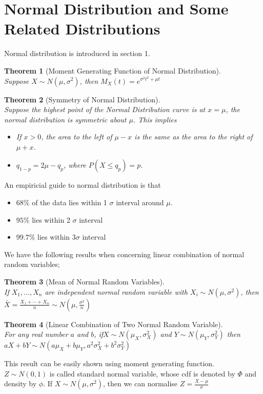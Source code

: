 \documentclass[12pt]{article}
\newtheorem{theorem}{Theorem}[section]
\theoremstyle{definition}
\begin{document}
\section{Normal Distribution and Some Related Distributions}
Normal distribution is introduced in section 1. 
\begin{theorem}[Moment Generating Function of Normal Distribution]
\hfill\\\normalfont Suppose $X\sim N(\mu, \sigma^2)$, then
$
M_X(t) = e^{\sigma^2t^2+\mu t}
$
\end{theorem}
\begin{theorem}[Symmetry of Normal Distribution]
\hfill\\\normalfont Suppose the highest point of the Normal Distribution curve is at $x=\mu$, the normal distribution is symmetric about $\mu$. This implies
\begin{itemize}
  \item If $x>0$, the area to the left of $\mu-x$ is the same as the area to the right of $\mu+x$.
  \item $q_{1-p} = 2\mu-q_p$, where $P(X\leq q_p) = p$.
\end{itemize}
\end{theorem}
An empiricial guide to normal distribution is that 
\begin{itemize}
  \item $68\%$ of the data lies within 1 $\sigma$ interval around $\mu$.
  \item $95\%$ lies within 2 $\sigma$ interval
  \item $99.7\%$ lies within 3$\sigma$ interval
\end{itemize}
We have the following results when concerning linear combination of normal random variables;
\begin{theorem}[Mean of Normal Random Variables]
\hfill\\\normalfont If $X_1,\ldots, X_n$ are independent normal random variable with $X_i\sim N(\mu, \sigma^2)$, then
$
\bar{X} = \frac{X_1+\cdots+X_n}{n} \sim N(\mu, \frac{\sigma^2}{n})
$
\end{theorem}
\begin{theorem}[Linear Combination of Two Normal Random Variable]
\hfill\\\normalfont For any real number $a$ and $b$, if$X\sim N(\mu_X, \sigma_X^2)$ and $Y\sim N(\mu_Y, \sigma_Y^2)$ then
$
aX+bY\sim N(a\mu_X+b\mu_Y, a^2\sigma_X^2+b^2\sigma_Y^2)
$
\end{theorem}
This result can be easily shown using moment generating function.\\
$Z\sim N(0,1)$ is called standard normal variable, whose cdf is denoted by $\Phi$ and density by $\phi$. If $X\sim N(\mu, \sigma^2)$, then we can normalise
$
Z=\frac{X-\mu}{\sigma}
$
\end{document}
